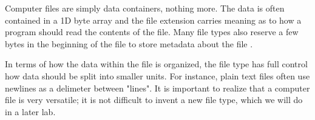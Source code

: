 Computer files are simply data containers, nothing more. The data is often contained in a 1D byte array and the file extension carries meaning as to how a program should read the contents of the file. Many file types also reserve a few bytes in the beginning of the file to store metadata about the file \cite{wiki_computer_file}.

In terms of how the data within the file is organized, the file type has full control how data should be split into smaller units. For instance, plain text files often use newlines as a delimeter between "lines". It is important to realize that a computer file is very versatile; it is not difficult to invent a new file type, which we will do in a later lab. 
